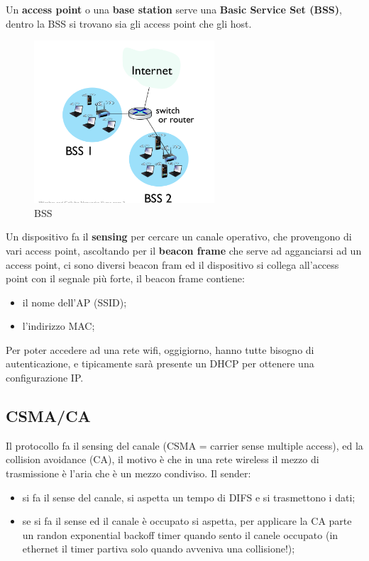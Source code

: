 \documentclass[12pt]{article}
\begin{document}
Un \textbf{access point} o una \textbf{base station} serve una \textbf{Basic Service Set (BSS)}, dentro la BSS si trovano sia gli access point che gli host.
\begin{figure}[H]
    \centering
    \includegraphics[width=0.6\textwidth]{bss.png}
    \caption{BSS}
    \label{fig:bss}
\end{figure}

Un dispositivo fa il \textbf{sensing} per cercare un canale operativo, che provengono di vari access point, ascoltando per il \textbf{beacon frame} che serve ad agganciarsi ad un access point, ci sono diversi beacon fram ed il dispositivo si collega all'access point con il segnale pi\`u forte, il beacon frame contiene:
\begin{itemize}
    \item il nome dell'AP (SSID);
    \item l'indirizzo MAC;
\end{itemize}
Per poter accedere ad una rete wifi, oggigiorno, hanno tutte bisogno di autenticazione, e tipicamente sar\`a presente un DHCP per ottenere una configurazione IP.

\subsection{CSMA/CA}
Il protocollo fa il sensing del canale (CSMA = carrier sense multiple access), ed la collision avoidance (CA), il motivo \`e che in una rete wireless il mezzo di trasmissione \`e l'aria che \`e un mezzo condiviso. 
Il sender:
\begin{itemize}
    \item si fa il sense del canale, si aspetta un tempo di DIFS e si trasmettono i dati;
    \item se si fa il sense ed il canale \`e occupato si aspetta, per applicare la CA parte un randon exponential backoff timer quando sento il canele occupato (in ethernet il timer partiva solo quando avveniva una collisione!);
\end{itemize}
\end{document}
